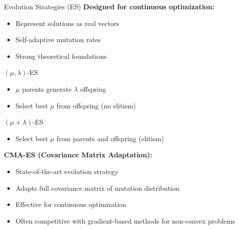 \documentclass[aspectratio=169]{beamer}
\begin{document}
\begin{frame}{Evolution Strategies (ES)}
  \textbf{Designed for continuous optimization:}
  \begin{itemize}
    \item Represent solutions as real vectors
    \item Self-adaptive mutation rates
    \item Strong theoretical foundations
  \end{itemize}

  \vspace{0.5em}

  \begin{definitionbox}{$(\mu, \lambda)$-ES}
    \begin{itemize}
      \item $\mu$ parents generate $\lambda$ offspring
      \item Select best $\mu$ from offspring (no elitism)
    \end{itemize}
  \end{definitionbox}

  \begin{definitionbox}{$(\mu + \lambda)$-ES}
    \begin{itemize}
      \item Select best $\mu$ from parents and offspring (elitism)
    \end{itemize}
  \end{definitionbox}

  \vspace{0.5em}

  \textbf{CMA-ES (Covariance Matrix Adaptation):}
  \begin{itemize}
    \item State-of-the-art evolution strategy
    \item Adapts full covariance matrix of mutation distribution
    \item Effective for continuous optimization
    \item Often competitive with gradient-based methods for non-convex problems
  \end{itemize}
\end{frame}
\end{document}
